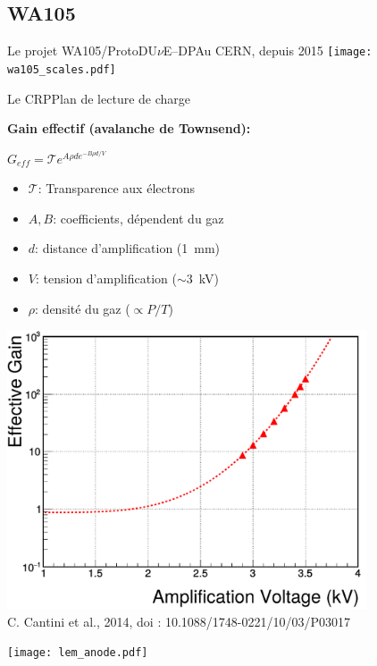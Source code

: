   \subsection{WA105}

    \begin{frame}{Le projet WA105/ProtoDU$\nu$E--DP}{Au CERN, depuis 2015}
        \centering
       	\vspace{-0.5cm}\hspace{-0.4cm}\texttt{[image: wa105\_scales.pdf]}
    \end{frame}
        
    \begin{frame}{Le CRP}{Plan de lecture de charge}
   		\begin{minipage}{0.43\textwidth}
   			\begin{scriptsize}
	   			\textbf{Gain effectif (avalanche de Townsend):}\\
	   		\end{scriptsize}
   			$G_{eff} = \mathcal{T}e^{A\rho d e^{-B\rho d/V}}$\\
   			\begin{scriptsize}
    			\begin{itemize}
    				\item $\mathcal{T}$: Transparence aux électrons
    				\item $A,B$: coefficients, dépendent du gaz
    				\item $d$: distance d'amplification (\SI{1}{\milli\meter})
    				\item $V$: tension d'amplification ($\sim$\SI{3}{\kilo\volt})
    				\item $\rho$: densité du gaz ($\propto P/T$)
    			\end{itemize}
    		\end{scriptsize} 
   			\vfill\centering\includegraphics[width=0.8\textwidth]{./pictures/gain_3L.pdf}\\\tiny{C. Cantini et al., 2014, doi : 10.1088/1748-0221/10/03/P03017}
   		\end{minipage}\hfill
   		\begin{minipage}{0.52\textwidth}
   			\texttt{[image: lem\_anode.pdf]}
   		\end{minipage}
    \end{frame}
    
